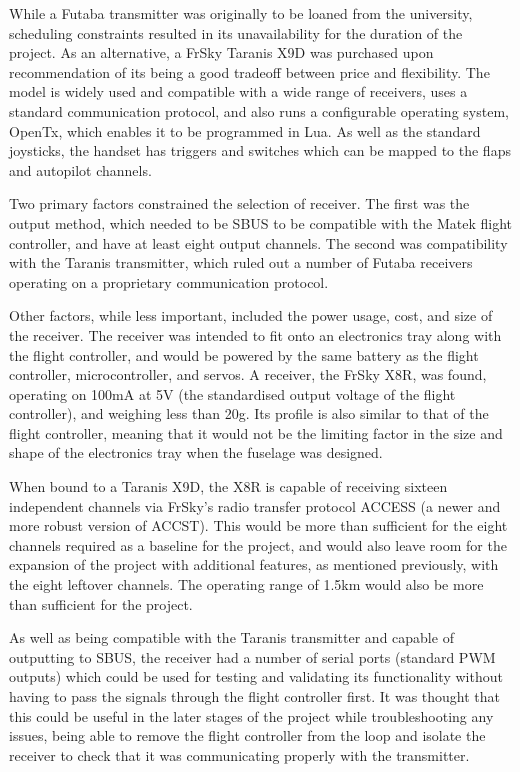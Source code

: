 \documentclass[../../main.tex]{subfiles}
\begin{document}

While a Futaba transmitter was originally to be loaned from the university, scheduling constraints resulted in its unavailability for the duration of the project.
As an alternative, a FrSky Taranis X9D was purchased upon recommendation of its being a good tradeoff between price and flexibility.
The model is widely used and compatible with a wide range of receivers, uses a standard communication protocol, and also runs a configurable operating system, OpenTx, which enables it to be programmed in Lua.
As well as the standard joysticks, the handset has triggers and switches which can be mapped to the flaps and autopilot channels. 

Two primary factors constrained the selection of receiver.
The first was the output method, which needed to be SBUS to be compatible with the Matek flight controller, and have at least eight output channels.
The second was compatibility with the Taranis transmitter, which ruled out a number of Futaba receivers operating on a proprietary communication protocol. 

Other factors, while less important, included the power usage, cost, and size of the receiver.
The receiver was intended to fit onto an electronics tray along with the flight controller, and would be powered by the same battery as the flight controller, microcontroller, and servos.
A receiver, the FrSky X8R, was found, operating on 100mA at 5V (the standardised output voltage of the flight controller), and weighing less than 20g.
Its profile is also similar to that of the flight controller, meaning that it would not be the limiting factor in the size and shape of the electronics tray when the fuselage was designed. 

When bound to a Taranis X9D, the X8R is capable of receiving sixteen independent channels via FrSky’s radio transfer protocol ACCESS (a newer and more robust version of ACCST).
This would be more than sufficient for the eight channels required as a baseline for the project, and would also leave room for the expansion of the project with additional features, as mentioned previously, with the eight leftover channels.
The operating range of 1.5km would also be more than sufficient for the project. 

As well as being compatible with the Taranis transmitter and capable of outputting to SBUS, the receiver had a number of serial ports (standard PWM outputs) which could be used for testing and validating its functionality without having to pass the signals through the flight controller first.
It was thought that this could be useful in the later stages of the project while troubleshooting any issues, being able to remove the flight controller from the loop and isolate the receiver to check that it was communicating properly with the transmitter. 
\end{document}
